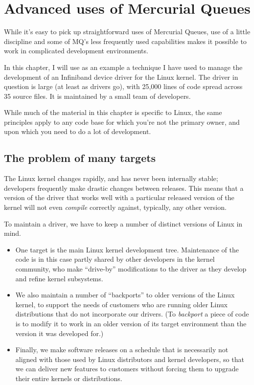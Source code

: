 \chapter{Advanced uses of Mercurial Queues}
\label{chap:mq-collab}

While it's easy to pick up straightforward uses of Mercurial Queues,
use of a little discipline and some of MQ's less frequently used
capabilities makes it possible to work in complicated development
environments.

In this chapter, I will use as an example a technique I have used to
manage the development of an Infiniband device driver for the Linux
kernel.  The driver in question is large (at least as drivers go),
with 25,000 lines of code spread across 35 source files.  It is
maintained by a small team of developers.

While much of the material in this chapter is specific to Linux, the
same principles apply to any code base for which you're not the
primary owner, and upon which you need to do a lot of development.

\section{The problem of many targets}

The Linux kernel changes rapidly, and has never been internally
stable; developers frequently make drastic changes between releases.
This means that a version of the driver that works well with a
particular released version of the kernel will not even \emph{compile}
correctly against, typically, any other version.

To maintain a driver, we have to keep a number of distinct versions of
Linux in mind.
\begin{itemize}
\item One target is the main Linux kernel development tree.
  Maintenance of the code is in this case partly shared by other
  developers in the kernel community, who make ``drive-by''
  modifications to the driver as they develop and refine kernel
  subsystems.
\item We also maintain a number of ``backports'' to older versions of
  the Linux kernel, to support the needs of customers who are running
  older Linux distributions that do not incorporate our drivers.  (To
  \emph{backport} a piece of code is to modify it to work in an older
  version of its target environment than the version it was developed
  for.)
\item Finally, we make software releases on a schedule that is
  necessarily not aligned with those used by Linux distributors and
  kernel developers, so that we can deliver new features to customers
  without forcing them to upgrade their entire kernels or
  distributions.
\end{itemize}

